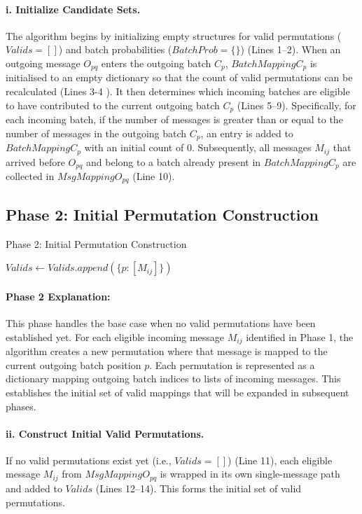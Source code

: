 \documentclass{article}
\begin{document}
\paragraph{i. Initialize Candidate Sets.}
The algorithm begins by initializing empty structures for valid permutations ($Valids = []$) and batch probabilities ($BatchProb = \{\}$) (Lines 1–2). When an outgoing message $O_{pq}$ enters the outgoing batch $C_p$, $BatchMappingC_p$ is initialised to an empty dictionary so that the count of valid permutations can be recalculated (Lines 3-4 ).
It then determines which incoming batches are eligible to have contributed to the current outgoing batch $C_p$ (Lines 5–9). Specifically, for each incoming batch, if the number of messages is greater than or equal to the number of messages in the outgoing batch $C
_p$, an entry is added to $BatchMappingC_p$ with an initial count of $0$.  
Subsequently, all messages $M_{ij}$ that arrived before $O_{pq}$ and belong to a batch already present in $BatchMappingC_p$ are collected in $MsgMappingO_{pq}$ (Line 10).

\subsection{Phase 2: Initial Permutation Construction}

\begin{algorithm}[H]
\caption{Phase 2: Initial Permutation Construction}
\begin{algorithmic}[1]
        \State $Valids \gets Valids.append(\{ p: [M_{ij}] \} )$
    \EndFor
\EndIf
\end{algorithmic}
\end{algorithm}

\paragraph{Phase 2 Explanation:}
This phase handles the base case when no valid permutations have been established yet. For each eligible incoming message $M_{ij}$ identified in Phase 1, the algorithm creates a new permutation where that message is mapped to the current outgoing batch position $p$. Each permutation is represented as a dictionary mapping outgoing batch indices to lists of incoming messages. This establishes the initial set of valid mappings that will be expanded in subsequent phases.

\paragraph{ii. Construct Initial Valid Permutations.}
If no valid permutations exist yet (i.e., $Valids = []$) (Line 11), each eligible message $M_{ij}$ from $MsgMappingO_{pq}$ is wrapped in its own single-message path and added to $Valids$ (Lines 12–14). This forms the initial set of valid permutations.
\end{document}
